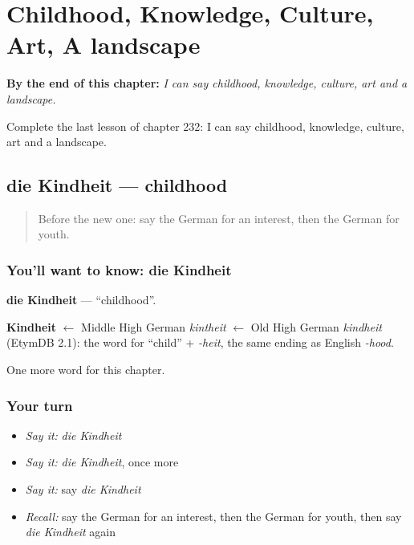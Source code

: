 
\chapter{Childhood, Knowledge, Culture, Art, A landscape}
\label{ch:ge-childhood-knowledge-culture-art-a-landscape}

\begin{chapteropening}
\textbf{By the end of this chapter:} \emph{I can say childhood, knowledge, culture, art and a landscape.}

Complete the last lesson of chapter 232: I can say childhood, knowledge, culture, art and a landscape.
\end{chapteropening}

\section[die Kindheit]{die Kindheit — childhood}

\label{lesson:GE-C232-kindheit}



\begin{quote}
Before the new one: say the German for an interest, then the German for youth.
\end{quote}

\subsection*{You'll want to know: die Kindheit}
\textbf{die Kindheit} — \textquotedblleft{}childhood\textquotedblright{}.

\begin{cousinweb}
\textbf{Kindheit} $\leftarrow$ Middle High German \emph{kintheit} $\leftarrow$ Old High German \emph{kindheit} (EtymDB 2.1): the word for \textquotedblleft{}child\textquotedblright{} + \emph{-heit}, the same ending as English \emph{-hood}.
\end{cousinweb}

\begin{grammarlens}[title={What you've built}]
One more word for this chapter.
\end{grammarlens}

\subsection*{Your turn}
\begin{itemize}
\raggedright
  \item \emph{Say it:} \emph{die Kindheit}
  \item \emph{Say it:} \emph{die Kindheit}, once more
  \item \emph{Say it:} say \emph{die Kindheit}
  \item \emph{Recall:} say the German for an interest, then the German for youth, then say \emph{die Kindheit} again
\end{itemize}


